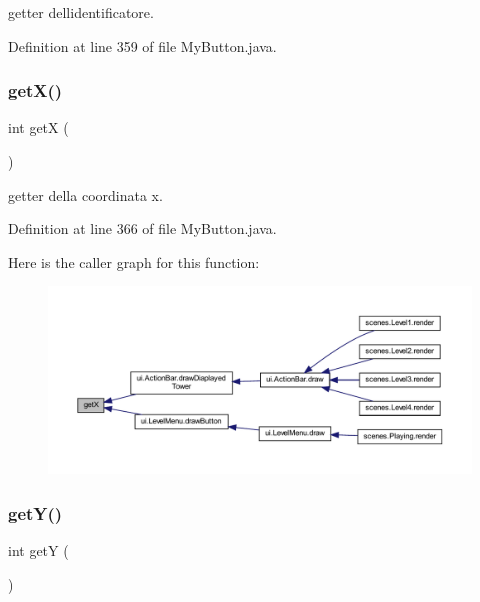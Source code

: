 getter dell\textquotesingle{}identificatore. 



Definition at line 359 of file My\+Button.\+java.

\mbox{\label{classui_1_1_my_button_ae13f88e922e1339355456062ad9fa359}} 
\subsubsection{\texorpdfstring{get\+X()}{getX()}}
{\footnotesize\ttfamily int getX (\begin{DoxyParamCaption}{ }\end{DoxyParamCaption})}



getter della coordinata x. 



Definition at line 366 of file My\+Button.\+java.

Here is the caller graph for this function\+:\nopagebreak
\begin{figure}[H]
\begin{center}
\leavevmode
\includegraphics[width=350pt]{classui_1_1_my_button_ae13f88e922e1339355456062ad9fa359_icgraph}
\end{center}
\end{figure}
\mbox{\label{classui_1_1_my_button_aab81944f0a14bba932c0931899951937}} 
\subsubsection{\texorpdfstring{get\+Y()}{getY()}}
{\footnotesize\ttfamily int getY (\begin{DoxyParamCaption}{ }\end{DoxyParamCaption})}



